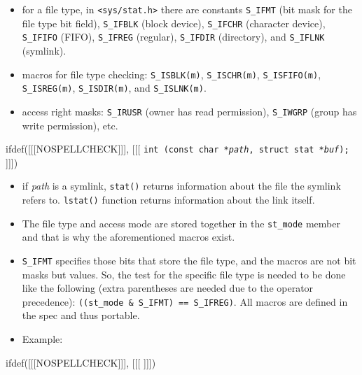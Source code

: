 \begin{slide}
\begin{itemize}
\item for a file type, in \texttt{<sys/stat.h>} there are
constants \verb#S_IFMT# (bit mask for the file type bit field), \verb#S_IFBLK#
(block device), \verb#S_IFCHR# (character device), \verb#S_IFIFO#
(FIFO), \verb#S_IFREG# (regular), \verb#S_IFDIR# (directory), and
\verb#S_IFLNK# (symlink). 
\item macros for file type checking: \verb#S_ISBLK(m)#,
\verb#S_ISCHR(m)#, \verb#S_ISFIFO(m)#, \verb#S_ISREG(m)#,
\verb#S_ISDIR(m)#, and \verb#S_ISLNK(m)#. 
\item access right masks: \verb#S_IRUSR# (owner has read permission),
\verb#S_IWGRP# (group has write permission), etc.
\end{itemize}
ifdef([[[NOSPELLCHECK]]], [[[
\texttt{int (const char *\emph{path}, struct stat
*\emph{buf});}
]]])
\begin{itemize}
\item if \emph{path} is a symlink, \texttt{stat()} returns information about the
file the symlink refers to. \texttt{lstat()} function returns information about the link
itself.
\end{itemize}
\end{slide}

\begin{itemize}
\item The file type and access mode are stored together in the
\verb#st_mode# member and that is why the aforementioned macros exist.
\item \texttt{S\_IFMT} specifies those bits that store the file type, and the
macros are not bit masks but values.  So, the test for the specific file type is
needed to be done like the following (extra parentheses are needed due to the
operator precedence): \texttt{((st\_mode~\&~S\_IFMT)~==~S\_IFREG)}.  All macros
are defined in the spec and thus portable.
\item Example: 
\end{itemize}


ifdef([[[NOSPELLCHECK]]], [[[
]]])

